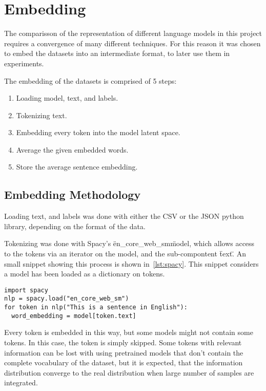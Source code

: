 \section{Embedding}\label{sec:Embedding}
The comparisson of the representation of different language models in this project requires a convergence of many different techniques. For this reason it was chosen to embed the datasets into an intermediate format, to later use them in experiments.

The embedding of the datasets is comprised of 5 steps:

\begin{enumerate}
  \item Loading model, text, and labels.
  \item Tokenizing text.
  \item Embedding every token into the model latent space.
  \item Average the given embedded words.
  \item Store the average sentence embedding.
\end{enumerate}

\subsection{Embedding Methodology}\label{sub:Embedding Methodology}

Loading text, and labels was done with either the CSV or the JSON python library, depending on the format of the data.

Tokenizing was done with Spacy's \"en_core_web_sm\" model, which allows access to the tokens via an iterator on the model, and the sub-compontent \"text\". An small snippet showing this process is shown in~\ref{lst:spacy}. This snippet considers a model has been loaded as a dictionary on tokens.

\begin{lstlisting}[caption={Tokenizing with Spacy},label=lst:spacy,frame=single]
import spacy
nlp = spacy.load("en_core_web_sm")
for token in nlp("This is a sentence in English"):
  word_embedding = model[token.text]
\end{lstlisting}

Every token is embedded in this way, but some models might not contain some tokens. In this case, the token is simply skipped. Some tokens with relevant information can be lost with using pretrained models that don't contain the complete vocabulary of the dataset, but it is expected, that the information distribution converge to the real distribution when large number of samples are integrated.


